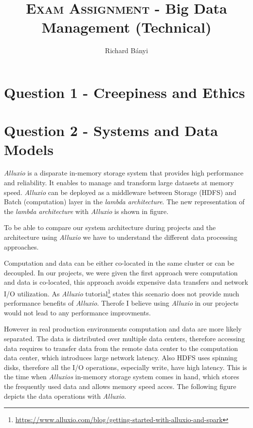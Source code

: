 \documentclass[format=acmsmall, review=false, screen=true]{acmart}
\author{Richard Bányi}
\title{\textsc{Exam Assignment} - Big Data Management (Technical) }
\begin{document}
\maketitle 

\section{Question 1 - Creepiness and Ethics }


\section{Question 2 - Systems and Data Models }

\textit{Alluxio} is a disparate in-memory storage system that provides high performance and reliability. It enables to manage and transform large datasets at memory speed. \textit{Alluxio} can be deployed as a middleware between Storage (HDFS) and Batch (computation) layer in the \textit{lambda architecture}. The new representation of the \textit{lambda architecture} with \textit{Alluxio} is shown in figure.

To be able to compare our system architecture during projects and the architecture using \textit{Alluxio} we have to understand the different data processing approaches.

Computation and data can be either co-located in the same cluster or can be decoupled. In our projects, we were given the first approach were computation and data is co-located, this approach avoids expensive data transfers and network I/O utilization. As \textit{Alluxio} tutorial\footnote{\url{https://www.alluxio.com/blog/getting-started-with-alluxio-and-spark}} states this scenario does not provide much performance benefits of \textit{Alluxio}. Therofe I believe using \textit{Alluxio} in our projects would not lead to any performance improvments.

However in real production environments computation and data are more likely separated. The data is distributed over multiple data centers, therefore accessing data requires to transfer data from the remote data center to the computation data center, which introduces large network latency. Also HDFS uses spinning disks, therefore all the I/O operations, especially write, have high latency. This is the time when \textit{Alluxios} in-memory storage system comes in hand, which stores the frequently used data and allows memory speed acces. The following figure depicts the data operations with \textit{Alluxio}.
\end{document}
